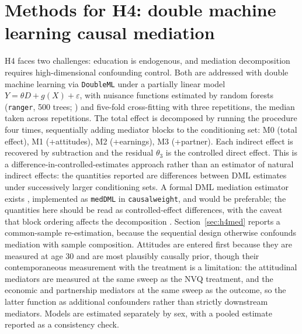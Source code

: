 \documentclass[12pt,a4paper]{report}
\begin{document}
\section{Methods for H4: double machine learning causal mediation}
H4 faces two challenges: education is endogenous, and mediation decomposition requires
high-dimensional confounding control. Both are addressed with double machine learning
\citep{chernozhukov2018} via \texttt{DoubleML} \citep{bach2024} under a partially linear model
$Y=\theta D + g(X) + \varepsilon$, with nuisance functions estimated by random forests
(\texttt{ranger}, 500 trees; \citealp{wrightziegler2017}) and five-fold cross-fitting with three
repetitions, the median taken across repetitions. The total effect is decomposed by running the
procedure four times, sequentially adding mediator blocks to the conditioning set: M0 (total
effect), M1 (+attitudes), M2 (+earnings), M3 (+partner). Each indirect effect is recovered by
subtraction and the residual $\theta_3$ is the controlled direct effect. This is a
difference-in-controlled-estimates approach rather than an estimator of natural indirect effects: the
quantities reported are differences between DML estimates under successively larger conditioning sets.
A formal DML mediation estimator exists \citep{farbmacher2022}, implemented as
\texttt{medDML} in \texttt{causalweight}, and would be preferable; the
quantities here should be read as controlled-effect differences, with the caveat that block
ordering affects the decomposition \citep{imai2010}. Section~\ref{sec:h4med} reports a common-sample
re-estimation, because the sequential design otherwise confounds mediation with sample composition.
Attitudes are entered first because they are measured at age 30
and are most plausibly causally prior, though their contemporaneous measurement with the treatment
is a limitation: the attitudinal mediators are measured at the same sweep as the NVQ treatment, and
the economic and partnership mediators at the same sweep as the outcome, so the latter function as
additional confounders rather than strictly downstream mediators. Models are estimated separately by
sex, with a pooled estimate reported as a consistency check.
\end{document}
